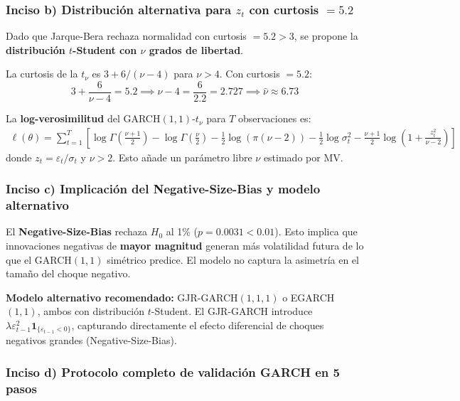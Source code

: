 \documentclass[12pt,a4paper]{article}
\begin{document}
\subsubsection*{Inciso b) Distribución alternativa para $z_t$ con curtosis $=5.2$}

\begin{solucion}
Dado que Jarque-Bera rechaza normalidad con curtosis $=5.2>3$, se propone la \textbf{distribución $t$-Student con $\nu$ grados de libertad}.

La curtosis de la $t_\nu$ es $3+6/(\nu-4)$ para $\nu>4$. Con curtosis $=5.2$:
\begin{equation}
3 + \frac{6}{\nu-4} = 5.2 \implies \nu-4 = \frac{6}{2.2} = 2.727 \implies \hat{\nu} \approx 6.73
\end{equation}

La \textbf{log-verosimilitud} del GARCH$(1,1)$-$t_\nu$ para $T$ observaciones es:
\begin{align*}
\ell(\theta) = \sum_{t=1}^T\left[\log\Gamma\!\left(\tfrac{\nu+1}{2}\right) - \log\Gamma\!\left(\tfrac{\nu}{2}\right) - \tfrac{1}{2}\log(\pi(\nu-2)) - \tfrac{1}{2}\log\sigma_t^2 - \tfrac{\nu+1}{2}\log\!\left(1+\frac{z_t^2}{\nu-2}\right)\right]
\end{align*}
donde $z_t=\varepsilon_t/\sigma_t$ y $\nu>2$. Esto añade un parámetro libre $\nu$ estimado por MV.
\end{solucion}

\subsubsection*{Inciso c) Implicación del Negative-Size-Bias y modelo alternativo}

\begin{solucion}
El \textbf{Negative-Size-Bias} rechaza $H_0$ al 1\% ($p=0.0031<0.01$). Esto implica que innovaciones negativas de \textbf{mayor magnitud} generan más volatilidad futura de lo que el GARCH$(1,1)$ simétrico predice. El modelo no captura la asimetría en el tamaño del choque negativo.

\textbf{Modelo alternativo recomendado:} GJR-GARCH$(1,1,1)$ o EGARCH$(1,1)$, ambos con distribución $t$-Student. El GJR-GARCH introduce $\lambda\varepsilon_{t-1}^2\mathbf{1}_{\{\varepsilon_{t-1}<0\}}$, capturando directamente el efecto diferencial de choques negativos grandes (Negative-Size-Bias).
\end{solucion}

\subsubsection*{Inciso d) Protocolo completo de validación GARCH en 5 pasos}
\end{document}
